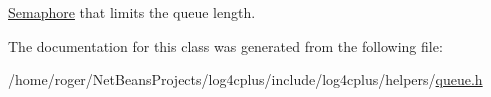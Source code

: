 \hyperlink{classlog4cplus_1_1thread_1_1Semaphore}{Semaphore} that limits the queue length. 



The documentation for this class was generated from the following file\-:\begin{DoxyCompactItemize}
\item 
/home/roger/\-Net\-Beans\-Projects/log4cplus/include/log4cplus/helpers/\hyperlink{queue_8h}{queue.\-h}\end{DoxyCompactItemize}
